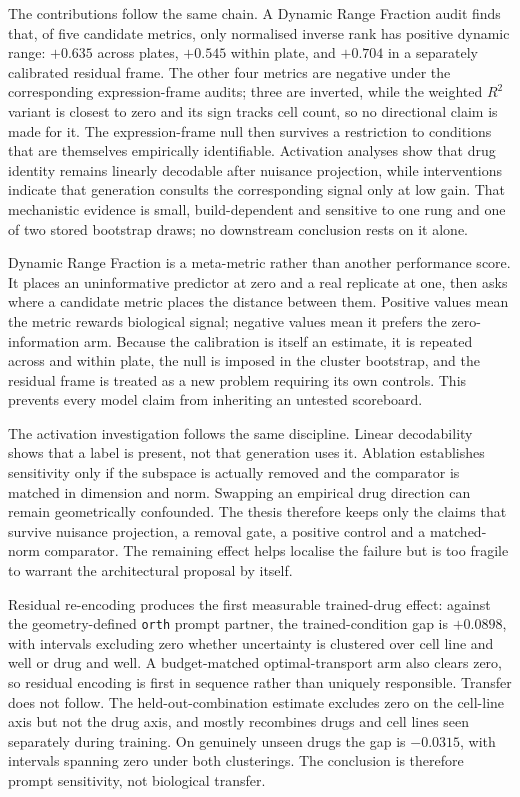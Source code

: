 The contributions follow the same chain. A Dynamic Range Fraction audit finds that, of five
candidate metrics, only normalised inverse rank has positive dynamic range: $+0.635$ across plates,
$+0.545$ within plate, and $+0.704$ in a separately calibrated residual frame. The other four
metrics are negative under the corresponding expression-frame audits; three are inverted, while the
weighted $R^2$ variant is closest to zero and its sign tracks cell count, so no directional claim is
made for it. The expression-frame null then survives a restriction to conditions that are themselves
empirically identifiable. Activation analyses show that drug identity remains linearly decodable
after nuisance projection, while interventions indicate that generation consults the corresponding
signal only at low gain. That mechanistic evidence is small, build-dependent and sensitive to one
rung and one of two stored bootstrap draws; no downstream conclusion rests on it alone.

Dynamic Range Fraction is a meta-metric rather than another performance score. It places an
uninformative predictor at zero and a real replicate at one, then asks where a candidate metric
places the distance between them. Positive values mean the metric rewards biological signal;
negative values mean it prefers the zero-information arm. Because the calibration is itself an
estimate, it is repeated across and within plate, the null is imposed in the cluster bootstrap, and
the residual frame is treated as a new problem requiring its own controls. This prevents every
model claim from inheriting an untested scoreboard.

The activation investigation follows the same discipline. Linear decodability shows that a label is
present, not that generation uses it. Ablation establishes sensitivity only if the subspace is
actually removed and the comparator is matched in dimension and norm. Swapping an empirical drug
direction can remain geometrically confounded. The thesis therefore keeps only the claims that
survive nuisance projection, a removal gate, a positive control and a matched-norm comparator. The
remaining effect helps localise the failure but is too fragile to warrant the architectural proposal
by itself.

Residual re-encoding produces the first measurable trained-drug effect: against the geometry-defined
\texttt{orth} prompt partner, the trained-condition gap is $+0.0898$, with intervals excluding
zero whether uncertainty is clustered over cell line and well or drug and well. A budget-matched
optimal-transport arm also clears zero, so residual encoding is first in sequence rather than
uniquely responsible. Transfer does not follow. The held-out-combination estimate excludes zero on
the cell-line axis but not the drug axis, and mostly recombines drugs and cell lines seen separately
during training. On genuinely unseen drugs the gap is $-0.0315$, with intervals spanning zero under
both clusterings. The conclusion is therefore prompt sensitivity, not biological transfer.

